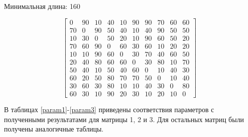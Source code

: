 \documentclass[a4paper,12pt]{article}
\begin{document}
\begin{enumerate}
Минимальная длина: 160

\[
\begin{bmatrix}
0& 90& 10& 40& 10& 90& 90& 70& 60& 60\\
70& 0& 90& 50& 40& 10& 40& 90& 50& 50\\
10& 30& 0& 50& 20& 10& 90& 60& 50& 20\\
70& 60& 90& 0& 60& 30& 60& 10& 20& 20\\
10& 10& 90& 60& 0& 30& 70& 40& 60& 50\\
20& 40& 80& 60& 60& 0& 30& 80& 10& 70\\
50& 40& 10& 50& 40& 60& 0& 10& 40& 30\\
60& 20& 50& 80& 70& 70& 50& 0& 10& 40\\
30& 60& 30& 80& 10& 10& 40& 30& 0& 80\\
60& 30& 10& 90& 20& 30& 10& 20& 10& 0
\end{bmatrix}
\]

\end{enumerate}

В таблицах \ref{param1}-\ref{param3} приведены соответствия параметров с полученными результатами для матрицы 1, 2 и 3. Для остальных матриц были получены аналогичные таблицы.
\end{document}
